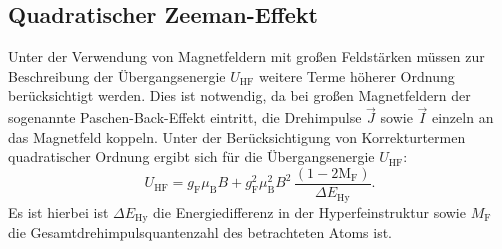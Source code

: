 \subsection{Quadratischer Zeeman-Effekt}
Unter der Verwendung von Magnetfeldern mit großen Feldstärken müssen zur Beschreibung der Übergangsenergie $U_{\mathrm{HF}}$ weitere Terme höherer Ordnung berücksichtigt werden.
Dies ist notwendig, da bei großen Magnetfeldern der sogenannte Paschen-Back-Effekt eintritt, die Drehimpulse $\vec{J}$ sowie $\vec{I}$ einzeln an das Magnetfeld koppeln.
Unter der Berücksichtigung von Korrekturtermen quadratischer Ordnung ergibt sich für die Übergangsenergie $U_{\mathrm{HF}}$:
\begin{equation}
\label{eqn:quadrat_zeeman}
U_{\mathrm{HF}}=g_{\mathrm{F}}\mu_{\mathrm{B}}B+g_{\mathrm{F}}^2\mu_{\mathrm{B}}^2B^2\, \frac{\left(1-2\mathrm{M_F}\right)}{\Delta E_{\mathrm{Hy}}}	\mathrm{.}
\end{equation}
Es ist hierbei ist $\Delta E_{\mathrm{Hy}}$ die Energiedifferenz in der Hyperfeinstruktur sowie $M_{\mathrm{F}}$ die Gesamtdrehimpulsquantenzahl des betrachteten Atoms ist.
